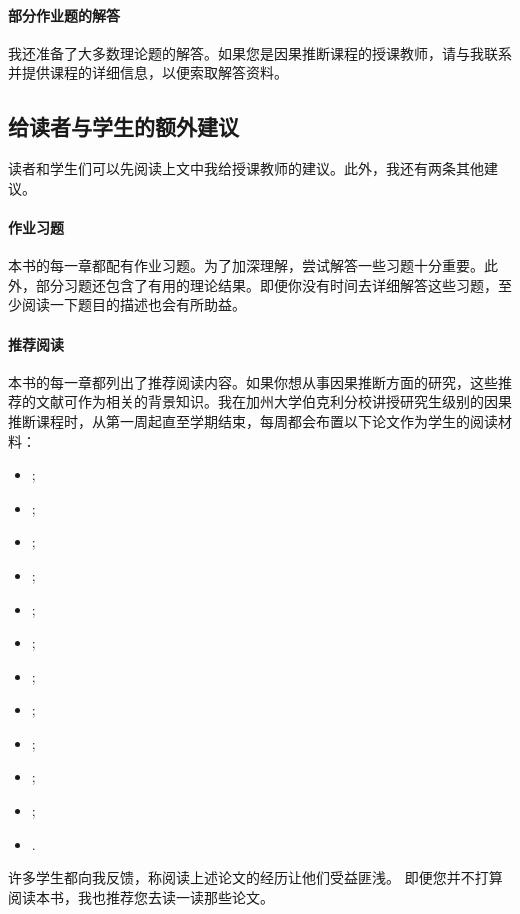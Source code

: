 \paragraph*{部分作业题的解答}
我还准备了大多数理论题的解答。如果您是因果推断课程的授课教师，请与我联系并提供课程的详细信息，以便索取解答资料。





\subsection*{给读者与学生的额外建议}



读者和学生们可以先阅读上文中我给授课教师的建议。此外，我还有两条其他建议。 


\paragraph*{作业习题}
本书的每一章都配有作业习题。为了加深理解，尝试解答一些习题十分重要。此外，部分习题还包含了有用的理论结果。即便你没有时间去详细解答这些习题，至少阅读一下题目的描述也会有所助益。 

\paragraph*{推荐阅读}
本书的每一章都列出了推荐阅读内容。如果你想从事因果推断方面的研究，这些推荐的文献可作为相关的背景知识。我在加州大学伯克利分校讲授研究生级别的因果推断课程时，从第一周起直至学期结束，每周都会布置以下论文作为学生的阅读材料：  
\begin{itemize}
\item 
\citet{bickel1975sex}; 
\item 
\citet{holland1986statistics};
\item
\citet{miratrix:2013};
\item
\citet{lin2013};
\item 
\citet{li2018asymptotic};
\item 
\citet{rosenbaum1983central};
\item 
\citet{lunceford2004stratification};
\item
\citet{ding2016sensitivity};
\item
\citet{pearl1995causal};
\item
\citet{angrist1996identification};
\item
\citet{imbens2014instrumental};
\item
\citet{frangakis2002principal}. 
\end{itemize}
许多学生都向我反馈，称阅读上述论文的经历让他们受益匪浅。  
即便您并不打算阅读本书，我也推荐您去读一读那些论文。 




